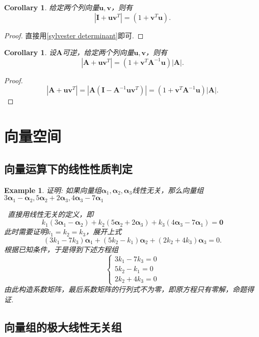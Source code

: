 \documentclass{article}
\newtheorem{corollary}[theorem]{Corollary}
\newtheorem{example}[theorem]{Example}
\newcommand{\hints}{{\color{blue} \text{hints}}}
\newcommand{\mbf}[1]{\bm{#1}}
\begin{document}
\begin{corollary}
\rm 给定两个列向量$\mbf{u},\mbf{v}$，则有
$$
|\mbf{I} + \mbf{u}\mbf{v}^{T}| = (1 + \mbf{v}^{T}\mbf{u}). 
$$
\end{corollary}

\begin{proof}
直接用\ref{sylvester determinant}即可. 
\end{proof}

\begin{corollary}
\rm 设$\mbf{A}$可逆，给定两个列向量$\mbf{u},\mbf{v}$，则有
$$
|\mbf{A} + \mbf{u}\mbf{v}^{T}| = (1+\mbf{v}^{T}\mbf{A}^{-1}\mbf{u})|\mbf{A}|.
$$
\end{corollary}

\begin{proof}
\rm 
$$
|\mbf{A} + \mbf{u}\mbf{v}^{T}| = |\mbf{A}(\mbf{I} - \mbf{A}^{-1}\mbf{u}\mbf{v}^{T})| = (1+\mbf{v}^{T}\mbf{A}^{-1}\mbf{u})|\mbf{A}|.
$$
\end{proof}

\newpage
\section{向量空间}

\subsection{向量运算下的线性性质判定}

\begin{example}
\rm 证明: 如果向量组$\mbf{\alpha}_1,\mbf{\alpha}_2,\mbf{\alpha}_3$线性无关，那么向量组$3\mbf{\alpha}_1-\mbf{\alpha}_2,5\mbf{\alpha}_2 + 2\mbf{\alpha}_3, 4\mbf{\alpha}_3-7\mbf{\alpha}_1$

\hints\ 直接用线性无关的定义，即
$$
k_1(3\mbf{\alpha}_1-\mbf{\alpha}_2) + k_2(5\mbf{\alpha}_2 + 2\mbf{\alpha}_3)+ k_3(4\mbf{\alpha}_3-7\mbf{\alpha}_1) = \mbf{0}
$$
此时需要证明$k_1 = k_2 = k_3$，展开上式
$$
(3k_1-7k_3)\mbf{\alpha}_1 + (5k_2 - k_1)\mbf{\alpha}_2 + (2k_2 +4k_3)\mbf{\alpha}_3 = 0. 
$$
根据已知条件，于是得到下述方程组
$$
\left \{
\begin{array}{ll}
3k_1-7k_3  = 0 \\
5k_2 - k_1 = 0 \\
2k_2 +4k_3 = 0
\end{array} \right.
$$
由此构造系数矩阵，最后系数矩阵的行列式不为零，即原方程只有零解，命题得证. 
\end{example}

\subsection{向量组的极大线性无关组}
\end{document}
